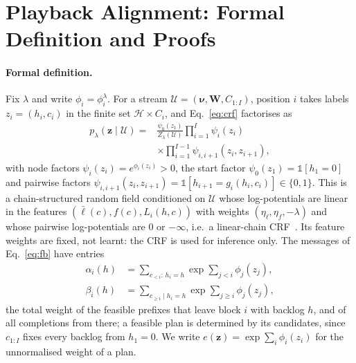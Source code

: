 \section{Playback Alignment: Formal Definition and Proofs}
\label{app:proofs}



\paragraph{Formal definition.} Fix $\lambda$ and write $\phi_i=\phi^\lambda_i$. For a stream
$\mathcal{U}=(\bm{\nu},\bm{W},C_{1:I})$, position $i$ takes labels $z_i=(h_i,c_i)$ in the finite set $\mathcal{H}\times C_i$,
and Eq.~\eqref{eq:crf} factorises as
\begin{equation}
\begin{aligned}
p_\lambda(\bm{z}\mid\mathcal{U})={}&\frac{\psi_0(z_1)}{Z_\lambda(\mathcal{U})}\prod_{i=1}^{I}\psi_i(z_i)\\
&\times\prod_{i=1}^{I-1}\psi_{i,i+1}(z_i,z_{i+1}),
\end{aligned}
\label{eq:crffactor}
\end{equation}
with node factors $\psi_i(z_i)=e^{\phi_i(z_i)}>0$, the start factor $\psi_0(z_1)=\mathds{1}[h_1=0]$ and pairwise
factors $\psi_{i,i+1}(z_i,z_{i+1})=\mathds{1}[h_{i+1}=g_i(h_i,c_i)]\in\{0,1\}$. This is a chain-structured random field
conditioned on $\mathcal{U}$ whose log-potentials are linear in the features $(\bar\ell(c),f(c),L_i(h,c))$ with weights
$(\eta_\ell,\eta_f,-\lambda)$ and whose pairwise log-potentials are $0$ or $-\infty$, i.e.\ a linear-chain
CRF~\citep{lafferty2001crf}. Its feature weights are fixed, not learnt: the CRF is used for inference only. The messages
of Eq.~\eqref{eq:fb} have entries
\begin{equation}
\begin{aligned}
\alpha_i(h)&=\textstyle\sum_{c_{<i}:\,h_i=h}\exp\sum_{j<i}\phi_j(z_j),\\
\beta_i(h)&=\textstyle\sum_{c_{\ge i}\mid h_i=h}\exp\sum_{j\ge i}\phi_j(z_j),
\end{aligned}
\label{eq:msg}
\end{equation}
the total weight of the feasible prefixes that leave block $i$ with backlog $h$, and of all completions from there; a
feasible plan is determined by its candidates, since $c_{1:I}$ fixes every backlog from $h_1=0$. We write
$e(\bm{z})=\exp\sum_i\phi_i(z_i)$ for the unnormalised weight of a plan.

